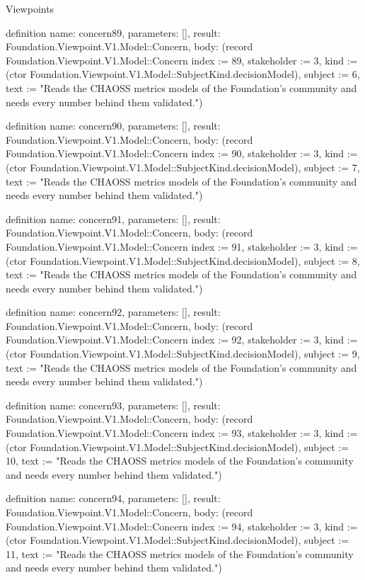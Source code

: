 \begin{lexlean}{Viewpoints}
\begin{semanticmodule}
definition{
  name: concern89,
  parameters: [],
  result: Foundation.Viewpoint.V1.Model::Concern,
  body: (record Foundation.Viewpoint.V1.Model::Concern {index := 89, stakeholder := 3, kind := (ctor Foundation.Viewpoint.V1.Model::SubjectKind.decisionModel), subject := 6, text := "Reads the CHAOSS metrics models of the Foundation's community and needs every number behind them validated."})
}

definition{
  name: concern90,
  parameters: [],
  result: Foundation.Viewpoint.V1.Model::Concern,
  body: (record Foundation.Viewpoint.V1.Model::Concern {index := 90, stakeholder := 3, kind := (ctor Foundation.Viewpoint.V1.Model::SubjectKind.decisionModel), subject := 7, text := "Reads the CHAOSS metrics models of the Foundation's community and needs every number behind them validated."})
}

definition{
  name: concern91,
  parameters: [],
  result: Foundation.Viewpoint.V1.Model::Concern,
  body: (record Foundation.Viewpoint.V1.Model::Concern {index := 91, stakeholder := 3, kind := (ctor Foundation.Viewpoint.V1.Model::SubjectKind.decisionModel), subject := 8, text := "Reads the CHAOSS metrics models of the Foundation's community and needs every number behind them validated."})
}

definition{
  name: concern92,
  parameters: [],
  result: Foundation.Viewpoint.V1.Model::Concern,
  body: (record Foundation.Viewpoint.V1.Model::Concern {index := 92, stakeholder := 3, kind := (ctor Foundation.Viewpoint.V1.Model::SubjectKind.decisionModel), subject := 9, text := "Reads the CHAOSS metrics models of the Foundation's community and needs every number behind them validated."})
}

definition{
  name: concern93,
  parameters: [],
  result: Foundation.Viewpoint.V1.Model::Concern,
  body: (record Foundation.Viewpoint.V1.Model::Concern {index := 93, stakeholder := 3, kind := (ctor Foundation.Viewpoint.V1.Model::SubjectKind.decisionModel), subject := 10, text := "Reads the CHAOSS metrics models of the Foundation's community and needs every number behind them validated."})
}

definition{
  name: concern94,
  parameters: [],
  result: Foundation.Viewpoint.V1.Model::Concern,
  body: (record Foundation.Viewpoint.V1.Model::Concern {index := 94, stakeholder := 3, kind := (ctor Foundation.Viewpoint.V1.Model::SubjectKind.decisionModel), subject := 11, text := "Reads the CHAOSS metrics models of the Foundation's community and needs every number behind them validated."})
}


\end{semanticmodule}
\end{lexlean}
